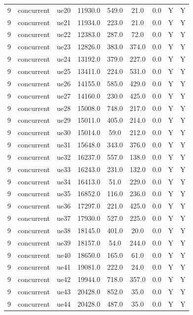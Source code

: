 \begin{table}[ht]
\begin{tabular}{|c|c|c|c|c|c|c|c|c|}
9 & concurrent & ue20 & 11930.0 & 549.0 & 21.0 & 0.0 & Y & Y \\
9 & concurrent & ue21 & 11934.0 & 223.0 & 21.0 & 0.0 & Y & Y \\
9 & concurrent & ue22 & 12383.0 & 287.0 & 72.0 & 0.0 & Y & Y \\
9 & concurrent & ue23 & 12826.0 & 383.0 & 374.0 & 0.0 & Y & Y \\
9 & concurrent & ue24 & 13192.0 & 379.0 & 227.0 & 0.0 & Y & Y \\
9 & concurrent & ue25 & 13411.0 & 224.0 & 531.0 & 0.0 & Y & Y \\
9 & concurrent & ue26 & 14155.0 & 585.0 & 429.0 & 0.0 & Y & Y \\
9 & concurrent & ue27 & 14160.0 & 230.0 & 425.0 & 0.0 & Y & Y \\
9 & concurrent & ue28 & 15008.0 & 748.0 & 217.0 & 0.0 & Y & Y \\
9 & concurrent & ue29 & 15011.0 & 405.0 & 214.0 & 0.0 & Y & Y \\
9 & concurrent & ue30 & 15014.0 & 59.0 & 212.0 & 0.0 & Y & Y \\
9 & concurrent & ue31 & 15648.0 & 343.0 & 376.0 & 0.0 & Y & Y \\
9 & concurrent & ue32 & 16237.0 & 557.0 & 138.0 & 0.0 & Y & Y \\
9 & concurrent & ue33 & 16243.0 & 231.0 & 132.0 & 0.0 & Y & Y \\
9 & concurrent & ue34 & 16413.0 & 51.0 & 229.0 & 0.0 & Y & Y \\
9 & concurrent & ue35 & 16852.0 & 116.0 & 236.0 & 0.0 & Y & Y \\
9 & concurrent & ue36 & 17297.0 & 221.0 & 425.0 & 0.0 & Y & Y \\
9 & concurrent & ue37 & 17930.0 & 527.0 & 225.0 & 0.0 & Y & Y \\
9 & concurrent & ue38 & 18145.0 & 401.0 & 20.0 & 0.0 & Y & Y \\
9 & concurrent & ue39 & 18157.0 & 54.0 & 244.0 & 0.0 & Y & Y \\
9 & concurrent & ue40 & 18650.0 & 165.0 & 61.0 & 0.0 & Y & Y \\
9 & concurrent & ue41 & 19081.0 & 222.0 & 24.0 & 0.0 & Y & Y \\
9 & concurrent & ue42 & 19944.0 & 718.0 & 357.0 & 0.0 & Y & Y \\
9 & concurrent & ue43 & 20428.0 & 852.0 & 35.0 & 0.0 & Y & Y \\
9 & concurrent & ue44 & 20428.0 & 487.0 & 35.0 & 0.0 & Y & Y \\

\end{tabular}
\end{table}
